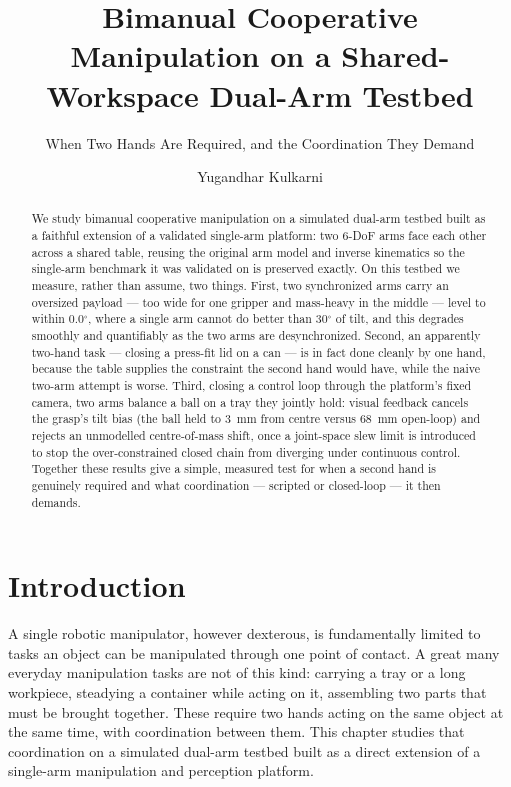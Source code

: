 \documentclass[runningheads]{llncs}
\begin{document}
\title{Bimanual Cooperative Manipulation on a Shared-Workspace Dual-Arm Testbed}
\subtitle{When Two Hands Are Required, and the Coordination They Demand}
\author{Yugandhar Kulkarni}
\maketitle

\begin{abstract}
We study bimanual cooperative manipulation on a simulated dual-arm testbed built as a
faithful extension of a validated single-arm platform: two 6-DoF arms face each other
across a shared table, reusing the original arm model and inverse kinematics so the
single-arm benchmark it was validated on is preserved exactly. On this testbed we measure,
rather than assume, two things. First, two synchronized arms carry an oversized payload ---
too wide for one gripper and mass-heavy in the middle --- level to within
0.0$^\circ$, where a single arm cannot do better than 30$^\circ$ of tilt, and this degrades
smoothly and quantifiably as the two arms are desynchronized. Second, an apparently
two-hand task --- closing a press-fit lid on a can --- is in fact done cleanly by one
hand, because the table supplies the constraint the second hand would have, while the
naive two-arm attempt is worse. Third, closing a control loop through the platform's fixed
camera, two arms balance a ball on a tray they jointly hold: visual feedback cancels the
grasp's tilt bias (the ball held to 3~mm
from centre versus 68~mm open-loop)
and rejects an unmodelled centre-of-mass shift, once a joint-space slew limit is introduced
to stop the over-constrained closed chain from diverging under continuous control. Together
these results give a simple, measured test for when a second hand is genuinely required and
what coordination --- scripted or closed-loop --- it then demands.
\end{abstract}

\section{Introduction}
A single robotic manipulator, however dexterous, is fundamentally limited to tasks an object can be manipulated through one point of contact. A great many everyday manipulation tasks are not of this kind: carrying a tray or a long workpiece, steadying a container while acting on it, assembling two parts that must be brought together. These require two hands acting on the same object at the same time, with coordination between them. This chapter studies that coordination on a simulated dual-arm testbed built as a direct extension of a single-arm manipulation and perception platform.
\end{document}
